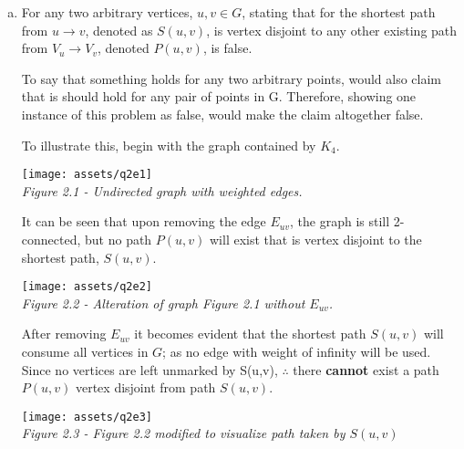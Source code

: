 \documentclass[10pt]{article}
\begin{document}
\begin{question}
    \begin{enumerate}[a)]
        \item
            For any two arbitrary vertices, $u,v \in G$, stating that for the shortest path from $u \rightarrow v$, denoted as $S(u,v)$, is vertex disjoint to any other existing path from $V_u \rightarrow V_v$, denoted $P(u,v)$, is false.
            
            To say that something holds for any two arbitrary points, would also claim that is should hold for any pair of points in G.
            Therefore, showing one instance of this problem as false, would make the claim altogether false.
            
            To illustrate this, begin with the graph contained by $K_4$.
            \begin{center}
                \texttt{[image: assets/q2e1]} \\
                \textit{Figure 2.1 - Undirected graph with weighted edges.}
            \end{center}
            It can be seen that upon removing the edge $E_{uv}$, the graph is still 2-connected, but no path $P(u,v)$ will exist that is vertex disjoint to the shortest path, $S(u,v)$.        
            
            \begin{center}
                \texttt{[image: assets/q2e2]} \\
                \textit{Figure 2.2 - Alteration of graph Figure 2.1 without $E_{uv}$.}
            \end{center}   
            After removing $E_{uv}$ it becomes evident that the shortest path $S(u,v)$ will consume all vertices in $G$; as no edge with weight of infinity will be used. Since no vertices are left unmarked by S(u,v), $\therefore$ there \textbf{cannot} exist a path $P(u,v)$ vertex disjoint from path $S(u,v)$.
            \begin{center}
                \texttt{[image: assets/q2e3]} \\
                \textit{Figure 2.3 - Figure 2.2 modified to visualize path taken by $S(u,v)$}
            \end{center}
    \end{enumerate}  
\end{question}
\end{document}
